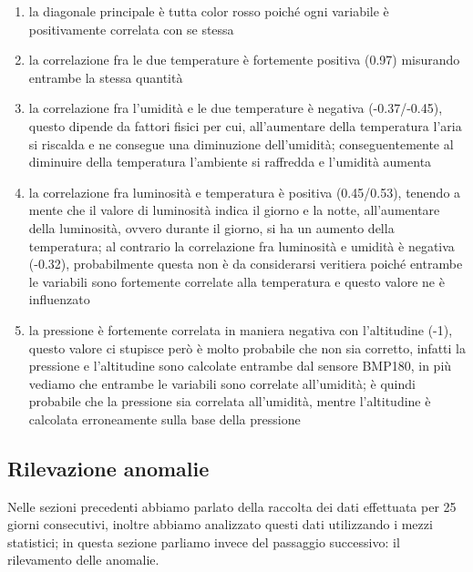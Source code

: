 \documentclass[a4paper, 12pt]{report}
\begin{document}
\begin{enumerate}
  \item la diagonale principale è tutta color rosso poiché ogni variabile è positivamente correlata con se stessa
  \item la correlazione fra le due temperature è fortemente positiva (0.97) misurando entrambe la stessa quantità
  \item la correlazione fra l'umidità e le due temperature è negativa (-0.37/-0.45), questo dipende da fattori fisici per cui, all'aumentare della temperatura l'aria si riscalda e ne consegue una diminuzione dell'umidità; 
  conseguentemente al diminuire della temperatura l'ambiente si raffredda e l'umidità aumenta
  \item la correlazione fra luminosità e temperatura è positiva (0.45/0.53), tenendo a mente che il valore di luminosità indica il giorno e la notte, all'aumentare della luminosità, ovvero durante il giorno, si ha un aumento
  della temperatura; al contrario la correlazione fra luminosità e umidità è negativa (-0.32), probabilmente questa non è da considerarsi veritiera poiché entrambe le variabili sono fortemente correlate alla temperatura e 
  questo valore ne è influenzato
  \item la pressione è fortemente correlata in maniera negativa con l'altitudine (-1), questo valore ci stupisce però è molto probabile che non sia corretto, infatti la pressione e l'altitudine sono calcolate
  entrambe dal sensore BMP180, in più vediamo che entrambe le variabili sono correlate all'umidità; è quindi probabile che la pressione sia correlata all'umidità, mentre l'altitudine è calcolata erroneamente sulla base 
  della pressione
\end{enumerate}

\subsection*{Rilevazione anomalie}
\vspace{0.5cm}

Nelle sezioni precedenti abbiamo parlato della raccolta dei dati effettuata per 25 giorni consecutivi, inoltre abbiamo analizzato questi dati utilizzando i mezzi statistici; in questa sezione parliamo invece del passaggio 
successivo: il rilevamento delle anomalie. 
\end{document}
